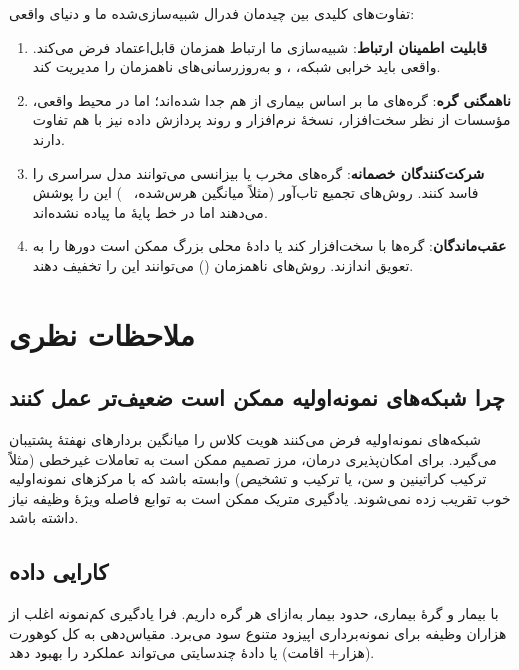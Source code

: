 تفاوت‌های کلیدی بین چیدمان فدرال شبیه‌سازی‌شده ما و  دنیای واقعی:
\begin{enumerate}
\item \textbf{قابلیت اطمینان ارتباط}: شبیه‌سازی ما ارتباط همزمان قابل‌اعتماد فرض می‌کند.  واقعی باید خرابی شبکه، ، و به‌روزرسانی‌های ناهمزمان را مدیریت کند.
\item \textbf{ناهمگنی گره}: گره‌های ما بر اساس بیماری از هم جدا شده‌اند؛ اما در محیط واقعی، مؤسسات از نظر سخت‌افزار، نسخۀ نرم‌افزار و روند پردازش داده نیز با هم تفاوت دارند.
\item \textbf{شرکت‌کنندگان خصمانه}: گره‌های مخرب یا بیزانسی می‌توانند مدل سراسری را فاسد کنند. روش‌های تجمیع تاب‌آور (مثلاً میانگین هرس‌شده، ~\cite{blanchard2017machine}) این را پوشش می‌دهند اما در خط پایۀ ما پیاده نشده‌اند.
\item \textbf{عقب‌ماندگان}: گره‌ها با سخت‌افزار کند یا دادۀ محلی بزرگ ممکن است دورها را به تعویق اندازند. روش‌های  ناهمزمان () می‌توانند این را تخفیف دهند.
\end{enumerate}

\section{ملاحظات نظری}

\subsection{چرا شبکه‌های نمونه‌اولیه ممکن است ضعیف‌تر عمل کنند}

شبکه‌های نمونه‌اولیه فرض می‌کنند هویت کلاس را میانگین بردارهای نهفتۀ پشتیبان می‌گیرد. برای امکان‌پذیری درمان، مرز تصمیم ممکن است به تعاملات غیرخطی (مثلاً ترکیب کراتینین و سن، یا ترکیب  و تشخیص) وابسته باشد که با مرکزهای نمونه‌اولیه خوب تقریب زده نمی‌شوند. یادگیری متریک ممکن است به توابع فاصله ویژۀ وظیفه نیاز داشته باشد.

\subsection{کارایی داده}

با  بیمار و  گرۀ بیماری، حدود  بیمار به‌ازای هر گره داریم. فرا یادگیری کم‌نمونه اغلب از هزاران وظیفه برای نمونه‌برداری اپیزود متنوع سود می‌برد. مقیاس‌دهی به کل کوهورت  (هزار+ اقامت) یا دادۀ چندسایتی می‌تواند عملکرد  را بهبود دهد.

